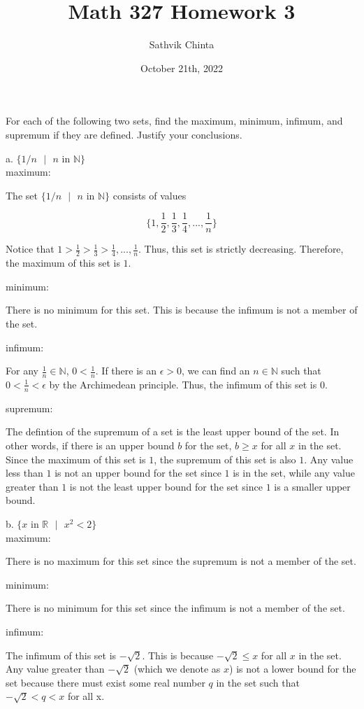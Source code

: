 \documentclass[addpoints]{exam}
\title{Math 327 Homework 3}
\author{Sathvik Chinta}
\date{October 21th, 2022}
\begin{document}
\maketitle

\begin{questions}
\question For each of the following two sets, find the maximum, minimum, infimum, and
supremum if they are defined. Justify your conclusions. 

a. $\{ 1/n \text{ } | \text{ } n \text{ in } \mathbb{N} \}$ \\
maximum:

The set $\{ 1/n \text{ } | \text{ } n \text{ in } \mathbb{N} \}$ consists of values

\[\{1, \frac{1}{2}, \frac{1}{3}, \frac{1}{4}, ..., \frac{1}{n}\}\]

Notice that $1 > \frac{1}{2} > \frac{1}{3} > \frac{1}{4}, ..., \frac{1}{n}$. Thus, 
this set is strictly decreasing. Therefore, the maximum of this set is $1$.

minimum:

There is no minimum for this set. This is because the infimum is not a member of the set.

infimum:

For any $\frac{1}{n} \in \mathbb{N}$, $0 < \frac{1}{n}$. If there is an $\epsilon > 0$,
we can find an $n \in \mathbb{N}$ such that $0 < \frac{1}{n} < \epsilon$ by the 
Archimedean principle. Thus, the infimum of this set is $0$.

supremum:

The defintion of the supremum of a set is the least upper bound of the set. In other words, 
if there is an upper bound $b$ for the set, $b \geq x$ for all $x$ in the set. Since the 
maximum of this set is $1$, the supremum of this set is also $1$. Any value less than 
$1$ is not an upper bound for the set since $1$ is in the set, while any value greater
than $1$ is not the least upper bound for the set since $1$ is a smaller upper bound.

b. $\{ x \text{ in } \mathbb{R} \text{ } | \text{ } x^2 < 2 \}$ \\
maximum:

There is no maximum for this set since the supremum is not a member of the set.

minimum:

There is no minimum for this set since the infimum is not a member of the set.

infimum:

The infimum of this set is $-\sqrt{2}$. This is because $-\sqrt{2} \leq x$ for
all $x$ in the set. Any value greater than $-\sqrt{2}$ (which we denote as $x$)
is not a lower bound for the set because there must exist some real number $q$ 
in the set such that $-\sqrt{2} < q < x$ for all x. 


\end{questions}
\end{document}
